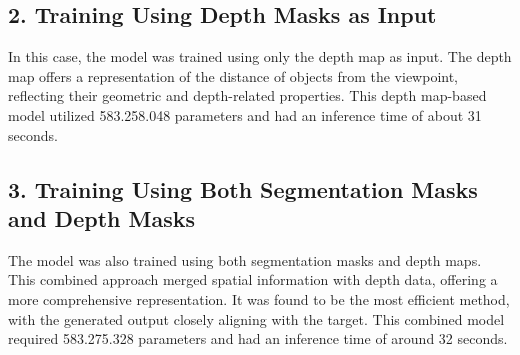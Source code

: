 \documentclass[12pt,a4paper]{report}
\begin{document}
\subsection*{2. Training Using Depth Masks as Input}
In this case, the model was trained using only the depth map as input. The depth map offers a representation of the distance of objects from the viewpoint, reflecting their geometric and depth-related properties. This depth map-based model utilized 583.258.048 parameters and had an inference time of about 31 seconds.

\subsection*{3. Training Using Both Segmentation Masks and Depth Masks}
The model was also trained using both segmentation masks and depth maps. This combined approach merged spatial information with depth data, offering a more comprehensive representation. It was found to be the most efficient method, with the generated output closely aligning with the target. This combined model required 583.275.328 parameters and had an inference time of around 32 seconds.
\end{document}
